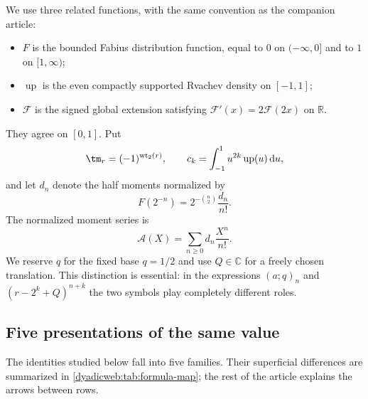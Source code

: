 \documentclass[11pt,oneside]{article}
\theoremstyle{definition}
\theoremstyle{remark}
\newcommand{\R}{\mathbb R}
\newcommand{\C}{\mathbb C}
\newcommand{\Up}{\operatorname{up}}
\newcommand{\wt}{\operatorname{wt}_2}
\newcommand{\dd}{\,\mathrm d}
\begin{document}
We use three related functions, with the same convention as the companion article:
\begin{itemize}
\item $F$ is the bounded Fabius distribution function, equal to $0$ on $(-\infty,0]$ and to
      $1$ on $[1,\infty)$;
\item $\Up$ is the even compactly supported Rvachev density on $[-1,1]$;
\item $\mathcal F$ is the signed global extension satisfying
      $\mathcal F'(x)=2\mathcal F(2x)$ on $\R$.
\end{itemize}
They agree on $[0,1]$.  Put
\[
 \tm_r=(-1)^{\wt(r)},\qquad
 c_k=\int_{-1}^{1}u^{2k}\Up(u)\dd u,
\]
and let $d_n$ denote the half moments normalized by
\begin{equation}
 F(2^{-n})=2^{-\binom n2}\frac{d_n}{n!}.                 \label{dyadicweb:eq:inverse-dyadic-input}
\end{equation}
The normalized moment series is
\begin{equation}
 \mathscr A(X)=\sum_{n\ge0}d_n\frac{X^n}{n!}.             \label{dyadicweb:eq:A-def}
\end{equation}
We reserve $q$ for the fixed base $q=1/2$ and use $Q\in\C$ for a freely chosen translation.
This distinction is essential: in the expressions $(a;q)_n$ and
$(r-2^k+Q)^{n+k}$ the two symbols play completely different roles.

\subsection{Five presentations of the same value}

The identities studied below fall into five families.  Their superficial differences are
summarized in \cref{dyadicweb:tab:formula-map}; the rest of the article explains the arrows between
rows.
\end{document}
